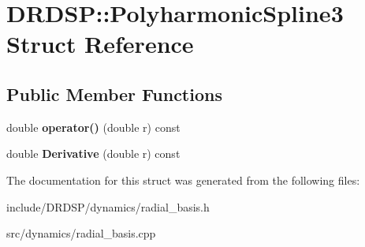 \hypertarget{struct_d_r_d_s_p_1_1_polyharmonic_spline3}{\section{D\-R\-D\-S\-P\-:\-:Polyharmonic\-Spline3 Struct Reference}
\label{struct_d_r_d_s_p_1_1_polyharmonic_spline3}
}
\subsection*{Public Member Functions}
\begin{DoxyCompactItemize}
\item 
\hypertarget{struct_d_r_d_s_p_1_1_polyharmonic_spline3_aefc5eef7e68a6cf816a46e9952e3d990}{double {\bfseries operator()} (double r) const }\label{struct_d_r_d_s_p_1_1_polyharmonic_spline3_aefc5eef7e68a6cf816a46e9952e3d990}

\item 
\hypertarget{struct_d_r_d_s_p_1_1_polyharmonic_spline3_a96ce1e41bbc790d39fa51d806d6fad10}{double {\bfseries Derivative} (double r) const }\label{struct_d_r_d_s_p_1_1_polyharmonic_spline3_a96ce1e41bbc790d39fa51d806d6fad10}

\end{DoxyCompactItemize}


The documentation for this struct was generated from the following files\-:\begin{DoxyCompactItemize}
\item 
include/\-D\-R\-D\-S\-P/dynamics/radial\-\_\-basis.\-h\item 
src/dynamics/radial\-\_\-basis.\-cpp\end{DoxyCompactItemize}
